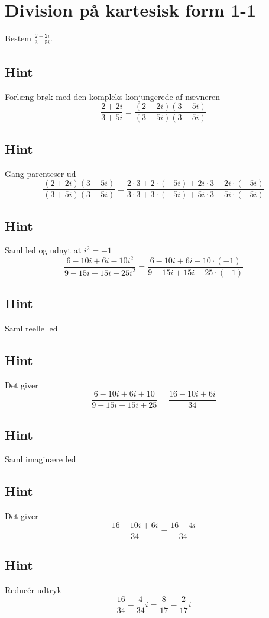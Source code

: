 \documentclass{article}
\newenvironment{exercise}[1]{\newpage\section{#1}}{}
\newcommand{\answerbox}[1]{\fbox{$#1$}}
\newcommand{\hint}{\subsection*{Hint}}
\begin{document}
\tableofcontents
\newpage

\begin{exercise}{Division på kartesisk form 1-1}

Bestem $\frac{2+2i}{3+5i}$.

\answerbox{\frac{8}{17} - \frac{2}{17}i}


\hint 

Forlæng brøk med den kompleks konjungerede af nævneren
\[
\frac{2+2i}{3+5i} = \frac{(2+2i)(3-5i)}{(3+5i)(3-5i)}
\]

\hint

Gang parenteser ud
\[
\frac{(2+2i)(3-5i)}{(3+5i)(3-5i)} = \frac{2 \cdot 3 + 2\cdot (-5i) + 2i \cdot 3 + 2i \cdot (-5i)}{3 \cdot 3 + 3\cdot (-5i)+5i \cdot 3 + 5i \cdot (-5i)}
\]

\hint 

Saml led og udnyt at $i^2 = -1$
\[
\frac{6-10i+6i-10i^2}{9-15i+15i-25i^2} = \frac{6-10i+6i-10 \cdot (-1)}{9-15i+15i-25 \cdot (-1)} 
\]

\hint

Saml reelle led

\hint

Det giver
\[
\frac{6-10i+6i+10}{9-15i+15i+ 25} = \frac{16 -10i + 6i}{34}
\]

\hint

Saml imaginære led


\hint

Det giver 
\[
\frac{16 -10i + 6i}{34} = \frac{16-4i}{34}
\]

\hint

Reducér udtryk
\[
\frac{16}{34} - \frac{4}{34}i  =\frac{8}{17} - \frac{2}{17}i
\]

\end{exercise}

\newpage
\end{document}
